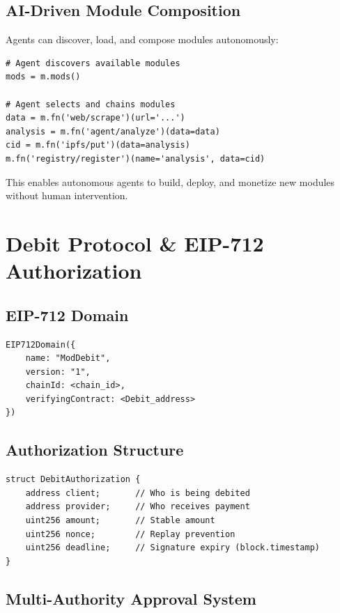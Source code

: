 \documentclass[11pt,a4paper]{article}
\begin{document}
\subsection{AI-Driven Module Composition}

Agents can discover, load, and compose modules autonomously:

\begin{lstlisting}[style=python]
# Agent discovers available modules
mods = m.mods()

# Agent selects and chains modules
data = m.fn('web/scrape')(url='...')
analysis = m.fn('agent/analyze')(data=data)
cid = m.fn('ipfs/put')(data=analysis)
m.fn('registry/register')(name='analysis', data=cid)
\end{lstlisting}

This enables autonomous agents to build, deploy, and monetize new modules without human intervention.

\section{Debit Protocol \& EIP-712 Authorization}
\label{sec:debit}

\subsection{EIP-712 Domain}

\begin{lstlisting}[style=solidity]
EIP712Domain({
    name: "ModDebit",
    version: "1",
    chainId: <chain_id>,
    verifyingContract: <Debit_address>
})
\end{lstlisting}

\subsection{Authorization Structure}

\begin{lstlisting}[style=solidity]
struct DebitAuthorization {
    address client;       // Who is being debited
    address provider;     // Who receives payment
    uint256 amount;       // Stable amount
    uint256 nonce;        // Replay prevention
    uint256 deadline;     // Signature expiry (block.timestamp)
}
\end{lstlisting}

\subsection{Multi-Authority Approval System}
\end{document}
